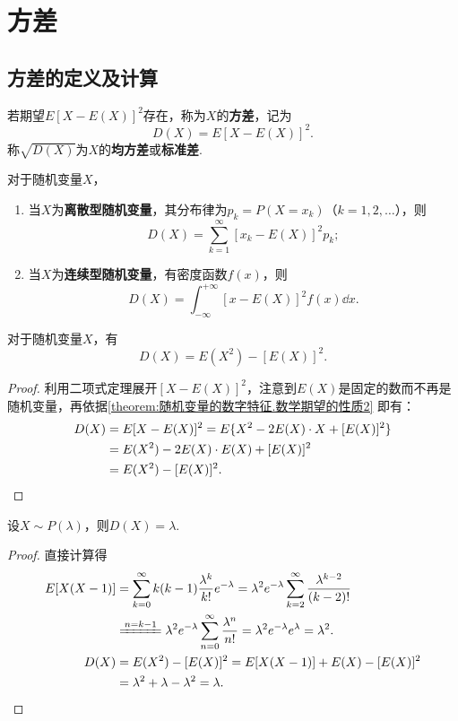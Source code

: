 \section{方差}
\subsection{方差的定义及计算}
\begin{definition}
若期望\(E[X-E(X)]^2\)存在，称为\(X\)的\textbf{方差}，记为\[
D(X) = E[X-E(X)]^2.
\]称\(\sqrt{D(X)}\)为\(X\)的\textbf{均方差}或\textbf{标准差}.
\end{definition}

\begin{theorem}
对于随机变量\(X\)，%
\begin{enumerate}
\item 当\(X\)为\textbf{离散型随机变量}，其分布律为\(p_k = P(X=x_k)\)（\(k=1,2,\dotsc\)），则\[
D(X) = \sum\limits_{k=1}^{\infty} [x_k - E(X)]^2 p_k;
\]
\item 当\(X\)为\textbf{连续型随机变量}，有密度函数\(f(x)\)，则\[
D(X) = \int_{-\infty}^{+\infty} [x - E(X)]^2 f(x) \dd{x}.
\]
\end{enumerate}
\end{theorem}

\begin{corollary}\label{theorem:随机变量的数字特征.常用的方差的计算式}
对于随机变量\(X\)，有\begin{equation}
D(X) = E(X^2) - [E(X)]^2.
\end{equation}
\begin{proof}
利用二项式定理展开\([X-E(X)]^2\)，注意到\(E(X)\)是固定的数而不再是随机变量，再依据\cref{theorem:随机变量的数字特征.数学期望的性质2} 即有：
\begin{align*}
D(X) &= E[X-E(X)]^2
= E\{X^2 - 2E(X) \cdot X + [E(X)]^2\} \\
&= E(X^2) - 2E(X) \cdot E(X) + [E(X)]^2 \\
&= E(X^2) - [E(X)]^2.
\qedhere
\end{align*}
\end{proof}
\end{corollary}

\begin{theorem}
设\(X \sim P(\lambda)\)，则\(D(X) = \lambda\).
\begin{proof}
直接计算得
\begin{align*}
E[X(X-1)]
&= \sum\limits_{k=0}^{\infty}{k(k-1) \frac{\lambda^k}{k!} e^{-\lambda}}
= \lambda^2 e^{-\lambda} \sum\limits_{k=2}^{\infty}{\frac{\lambda^{k-2}}{(k-2)!}} \\
&\xlongequal{n=k-1} \lambda^2 e^{-\lambda} \sum\limits_{n=0}^{\infty}{\frac{\lambda^n}{n!}}
= \lambda^2 e^{-\lambda} e^{\lambda} = \lambda^2. \\
D(X)
&= E(X^2) - [E(X)]^2
= E[X(X-1)] + E(X) - [E(X)]^2 \\
&= \lambda^2 + \lambda - \lambda^2 = \lambda.
\qedhere
\end{align*}
\end{proof}
\end{theorem}

